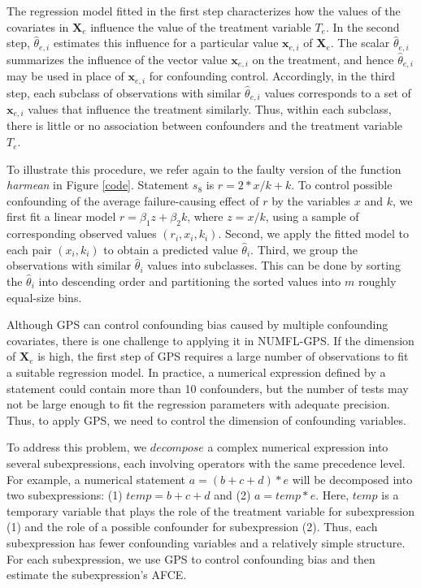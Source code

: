 The regression model fitted in the first step characterizes how the values of the covariates in $\pmb{X}_e$ influence the value of the treatment variable $T_e$.  In the second step, $\hat{\theta}_{e,i}$ estimates this influence for a particular value $\pmb{x}_{e,i}$ of $\pmb{X}_e$.  The scalar $\hat{\theta}_{e,i}$ summarizes the influence of the vector value $\pmb{x}_{e,i}$ on the treatment, and hence $\hat{\theta}_{e,i}$ may be used in place of $\pmb{x}_{e,i}$ for confounding control. Accordingly, in the third step, each subclass of observations with similar $\hat{\theta}_{e,i}$ values corresponds to a set of $\pmb{x}_{e,i}$ values that influence the treatment similarly. Thus, within each subclass, there is little or no association between confounders and the treatment variable $T_e$.

To illustrate this procedure, we refer again to the faulty version of the function {\it harmean} in Figure \ref{code}.  Statement $s_8$ is $r=2*x/k +k$. To control possible confounding of the average failure-causing effect of $r$ by the variables $x$ and $k$, we first fit a linear model $r=\beta_1 z+\beta_2 k$, where $z=x/k$, using a sample of corresponding observed values $(r_i,x_i,k_i)$. Second, we apply the fitted model to each pair $(x_i,k_i)$ to obtain a predicted value $\hat \theta_i$.  Third, we group the observations with similar $\hat \theta_i$ values into subclasses. This can be done by sorting the $\hat \theta_i$ into descending order and partitioning the sorted values into $m$ roughly equal-size bins.

Although GPS can control confounding bias caused by multiple confounding covariates, there is one challenge to applying it in NUMFL-GPS. If the dimension of $\pmb{X}_e$ is high, the first step of GPS requires a large number of observations to fit a suitable regression model.  In practice, a numerical expression defined by a statement could contain more than 10 confounders, but the number of tests may not be large enough to fit the regression parameters with adequate precision. Thus, to apply GPS, we need to control the dimension of confounding variables.

To address this problem, we $decompose$ a complex numerical expression into several subexpressions, each involving operators with the same precedence level.  For example, a numerical statement $a=(b+c+d)*e$ will be decomposed into two subexpressions: (1) $temp=b+c+d$ and (2) $a=temp*e$.  Here, $temp$ is a temporary variable that plays the role of the treatment variable for subexpression (1) and the role of a possible confounder for subexpression (2). Thus, each subexpression has fewer confounding variables and a relatively simple structure.  For each subexpression, we use GPS to control confounding bias and then estimate the subexpression's AFCE.

